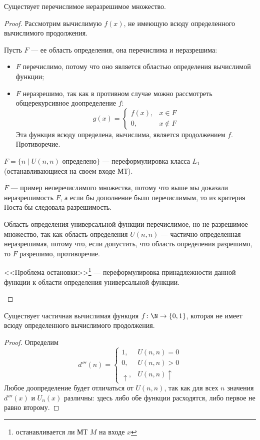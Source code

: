 \begin{thm}\label{thm:existing_set}
    Существует перечислимое неразрешимое множество.
\end{thm}
\begin{proof}
	Рассмотрим вычислимую $ f(x)$, не имеющую всюду определенного вычислимого продолжения.

	Пусть $ F$ --- ее область определения, она перечислима и неразрешима:
	\begin{itemize}
		\item $ F$ перечислимо, потому что оно является областью определения вычислимой функции;
		\item $ F$ неразрешимо, так как в противном случае можно
			рассмотреть общерекурсивное доопределение $ f$:
			 \[
				 g(x) = \begin{cases}
					 f(x), & x \in F \\
					 0, & x \notin F 
				 \end{cases}
			\] 
			Эта функция всюду определена, вычислима, является продолжением $ f$. Противоречие.
	\end{itemize}
\begin{note}
	$ F = \{n \mid U(n, n) \text{ определено}\}$ --- переформулировка класса $ L_1$ (останавливающиеся на своем входе МТ).
\end{note}
\begin{note}
    $ \overline{F}$ --- пример неперечислимого множества, потому что выше мы доказали неразрешимость $F$, а если бы дополнение было перечислимым, то из критерия Поста бы следовала разрешимость.
\end{note}
\begin{note}
    Область определения универсальной функции перечислимое, но не разрешимое множество, 
	так как область определения $ U(n, n)$ --- частично определенная неразрешимая, потому что, если допустить, что область определения разрешимо, то $F$ разрешимо, противоречие.
\end{note}
\begin{note}
	<<Проблема остановки>>\footnote{останавливается ли МТ $ M$ на входе $ x$} --- переформулировка принадлежности данной функции к области определения универсальной функции.
\end{note}
\end{proof}


\begin{thm}
    Существует частичная вычислимая функция $ f\colon  \N \to  \{0, 1\}$, которая не имеет  всюду определенного вычислимого продолжения.
\end{thm}
\begin{proof}
    Определим
	\[
		d'''(n) = \begin{cases}
		1, & U(n, n) = 0 \\
		0, & U(n, n) > 0 \\
		\uparrow, & U(n, n) \uparrow
	\end{cases}
	\] 
	Любое доопределение будет отличаться от $ U(n, n)$, так как для всех $ n$ значения $ d'''(x) $ и $ U_n(x)$ различны: здесь либо обе функции расходятся, либо первое не равно второму.
\end{proof}

